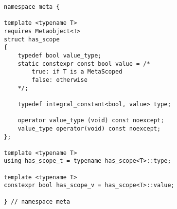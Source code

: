 
\begin{verbatim}
namespace meta {

template <typename T>
requires Metaobject<T>
struct has_scope
{
	typedef bool value_type;
	static constexpr const bool value = /*
		true: if T is a MetaScoped
		false: otherwise
	*/;

	typedef integral_constant<bool, value> type;

	operator value_type (void) const noexcept;
	value_type operator(void) const noexcept;
};

template <typename T>
using has_scope_t = typename has_scope<T>::type;

template <typename T>
constexpr bool has_scope_v = has_scope<T>::value;

} // namespace meta
\end{verbatim}
